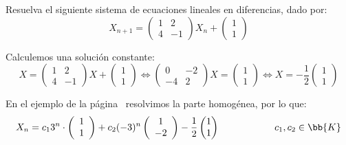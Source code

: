\begin{ejemplo}
    Resuelva el siguiente sistema de ecuaciones lineales en diferencias, dado por:
    $$X_{n+1} = \begin{pmatrix}
        1 & 2\\
        4 & -1
    \end{pmatrix}X_n + \begin{pmatrix}
        1\\1
    \end{pmatrix}$$

    Calculemos una solución constante:
    \begin{equation*}
        X = \begin{pmatrix}
            1 & 2\\
            4 & -1
        \end{pmatrix}X + \begin{pmatrix}
            1\\1
        \end{pmatrix}
        \Longleftrightarrow
        \begin{pmatrix}
            0 & -2\\
            -4 & 2
        \end{pmatrix}X = \begin{pmatrix}
            1\\1
        \end{pmatrix}
        \Longleftrightarrow
        X = -\frac{1}{2}\begin{pmatrix}
            1\\1
        \end{pmatrix}
    \end{equation*}

    En el ejemplo de la página~\pageref{ejemplo:SistSinDiagonalizar} resolvimos la parte homogénea, por lo que:
    \begin{equation*}
        X_n = c_13^n\cdot \left(
        \begin{array}{c}
            1\\1
        \end{array}
        \right) +c_2(-3)^n\left(
        \begin{array}{c}
            1\\-2
        \end{array}
        \right)
        -\frac{1}{2}\begin{pmatrix}
            1\\1
        \end{pmatrix}
        \hspace{2cm} c_1,c_2\in \bb{K}
    \end{equation*}
\end{ejemplo}



